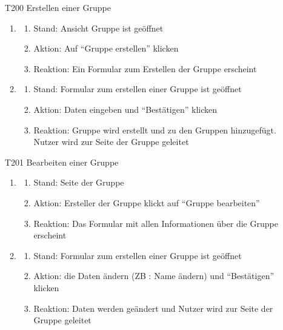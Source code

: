 \documentclass[parskip=full]{scrartcl}
\begin{document}
		\begin{itemize}
		\item[T200] Erstellen einer Gruppe
		\begin{enumerate}
			\item
			
			\begin{enumerate}[nosep]
				\item Stand: Ansicht Gruppe ist geöffnet
				\item Aktion: Auf “Gruppe erstellen” klicken
				\item Reaktion: Ein Formular zum Erstellen der  Gruppe erscheint
			\end{enumerate}
			\item
			\begin{enumerate}[nosep]	
				\item Stand: Formular zum erstellen einer Gruppe ist geöffnet
				\item Aktion: Daten eingeben und “Bestätigen” klicken
				\item Reaktion: Gruppe wird erstellt und zu den Gruppen hinzugefügt. Nutzer wird zur Seite der Gruppe geleitet
			\end{enumerate}	
		\end{enumerate}
		
		\item[T201] Bearbeiten einer Gruppe
		\begin{enumerate}
			\item
			
			\begin{enumerate}[nosep]
				\item Stand: Seite der Gruppe
				\item Aktion: Ersteller der Gruppe klickt auf “Gruppe bearbeiten”
				\item Reaktion: Das Formular mit allen Informationen über die Gruppe erscheint
			\end{enumerate}
			\item
			\begin{enumerate}[nosep]	
				\item Stand: Formular zum erstellen einer Gruppe ist geöffnet
				\item Aktion:  die Daten ändern (ZB : Name ändern) und “Bestätigen” klicken
				\item Reaktion: Daten werden geändert und Nutzer wird zur Seite der Gruppe geleitet
			\end{enumerate}	
		\end{enumerate}
		

\end{itemize}
\end{document}
